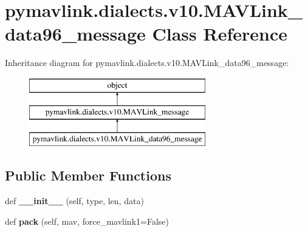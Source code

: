 \hypertarget{classpymavlink_1_1dialects_1_1v10_1_1MAVLink__data96__message}{}\section{pymavlink.\+dialects.\+v10.\+M\+A\+V\+Link\+\_\+data96\+\_\+message Class Reference}
\label{classpymavlink_1_1dialects_1_1v10_1_1MAVLink__data96__message}
Inheritance diagram for pymavlink.\+dialects.\+v10.\+M\+A\+V\+Link\+\_\+data96\+\_\+message\+:\begin{figure}[H]
\begin{center}
\leavevmode
\includegraphics[height=3.000000cm]{classpymavlink_1_1dialects_1_1v10_1_1MAVLink__data96__message}
\end{center}
\end{figure}
\subsection*{Public Member Functions}
\begin{DoxyCompactItemize}
\item 
\mbox{\label{classpymavlink_1_1dialects_1_1v10_1_1MAVLink__data96__message_aac7ab1e7b7a493c9c371b24aeea3d874}} 
def {\bfseries \+\_\+\+\_\+init\+\_\+\+\_\+} (self, type, len, data)
\item 
\mbox{\label{classpymavlink_1_1dialects_1_1v10_1_1MAVLink__data96__message_aa35c40864a85820e3dc94c71a8c495a4}} 
def {\bfseries pack} (self, mav, force\+\_\+mavlink1=False)
\end{DoxyCompactItemize}
